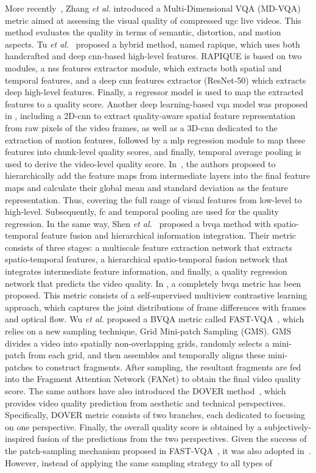 \documentclass[journal]{IEEEtran}
\begin{document}
More recently~\cite{zhang2023md}, Zhang \textit{et al.} introduced a Multi-Dimensional VQA (MD-VQA) metric aimed at assessing the visual quality of compressed \ac{ugc} live videos. This method evaluates the quality in terms of semantic, distortion, and motion aspects. Tu \textit{et al.}~\cite{tu2021rapique}  proposed a hybrid method, named \ac{rapique}, which uses both handcrafted and deep \ac{cnn}-based high-level features. RAPIQUE is based on two modules, a \ac{nss} features extractor module, which extracts both spatial and temporal features, and a deep \ac{cnn} features extractor (ResNet-50) which extracts deep high-level features. Finally, a regressor model is used to map the extracted features to a quality score. Another deep learning-based \ac{vqa} model was proposed in \cite{sun2022deep}, including a 2D-\ac{cnn} to extract quality-aware spatial feature representation from raw pixels of the video frames, as well as a 3D-\ac{cnn} dedicated to the extraction of motion features, followed by a \ac{mlp} regression module to map these features into chunk-level quality scores, and finally, temporal average pooling is used to derive the video-level quality score. In~\cite{sun2021deep}, the authors proposed to hierarchically add the feature maps from intermediate layers into the final feature maps and calculate their global mean and standard deviation as the feature representation. Thus, covering the full range of visual features from low-level to high-level. Subsequently,  \ac{fc} and temporal pooling are used for the quality regression. In the same way, Shen \textit{et al.}~\cite{shen2022end} proposed a \ac{bvqa} method with spatio-temporal feature fusion and hierarchical information integration. Their metric consists of three stages: a multiscale feature extraction network that extracts spatio-temporal features, a hierarchical spatio-temporal fusion network that integrates intermediate feature information, and finally, a quality regression network that predicts the video quality. In \cite{mitra2022multiview}, a completely \ac{bvqa} metric has been proposed. This metric consists of a self-supervised multiview contrastive learning approach, which captures the joint distributions of frame differences with frames and optical flow.  Wu \textit{et al.} proposed a BVQA metric called FAST-VQA~\cite{wu2022fast}, which relies on a new sampling technique, Grid Mini-patch Sampling (GMS). GMS divides a video into spatially non-overlapping grids, randomly selects a mini-patch from each grid, and then assembles and temporally aligns these mini-patches to construct fragments. After sampling, the resultant fragments are fed into the Fragment Attention Network (FANet) to obtain the final video quality score. The same authors have also introduced the DOVER method~\cite{wu2023exploring}, which provides video quality prediction from aesthetic and technical perspectives. Specifically, DOVER metric consists of two branches, each dedicated to focusing on one perspective. Finally, the overall quality score is obtained by a subjectively-inspired fusion of the predictions from the two perspectives. Given the success of the patch-sampling mechanism proposed in FAST-VQA~\cite{wu2022fast}, it was also adopted in~\cite{huang2023xgc}. However, instead of applying the same sampling strategy to all types of 
\end{document}
